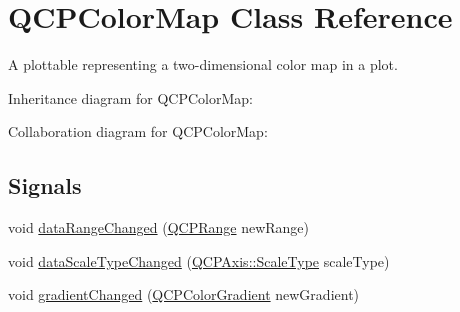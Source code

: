 \hypertarget{class_q_c_p_color_map}{}\section{Q\+C\+P\+Color\+Map Class Reference}
\label{class_q_c_p_color_map}


A plottable representing a two-\/dimensional color map in a plot.  




Inheritance diagram for Q\+C\+P\+Color\+Map\+:


Collaboration diagram for Q\+C\+P\+Color\+Map\+:
\subsection*{Signals}
\begin{DoxyCompactItemize}
\item 
void \hyperlink{class_q_c_p_color_map_a482980f2335d09cfb36dd95ba9663197}{data\+Range\+Changed} (\hyperlink{class_q_c_p_range}{Q\+C\+P\+Range} new\+Range)
\item 
void \hyperlink{class_q_c_p_color_map_a978d5d5c9f68cffef8c902b855c04490}{data\+Scale\+Type\+Changed} (\hyperlink{class_q_c_p_axis_a36d8e8658dbaa179bf2aeb973db2d6f0}{Q\+C\+P\+Axis\+::\+Scale\+Type} scale\+Type)
\item 
void \hyperlink{class_q_c_p_color_map_abf4797f86e422ac6e0f732c4ff1a4d49}{gradient\+Changed} (\hyperlink{class_q_c_p_color_gradient}{Q\+C\+P\+Color\+Gradient} new\+Gradient)
\end{DoxyCompactItemize}
